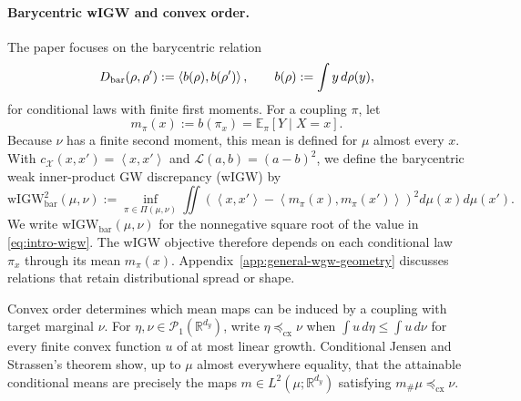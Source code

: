 \documentclass[11pt]{article}
\newcommand{\R}{\mathbb R}
\newcommand{\E}{\mathbb E}
\newcommand{\cP}{\mathcal P}
\newcommand{\ip}[2]{\left\langle #1,#2\right\rangle}
\newcommand{\cx}{\preceq_{\mathrm{cx}}}
\newcommand{\wIGW}{\mathrm{wIGW}_{\mathrm{bar}}}
\theoremstyle{plain}
\theoremstyle{definition}
\theoremstyle{remark}
\begin{document}
\conditionalcomparisonfigure

\paragraph{Barycentric wIGW and convex order.}
The paper focuses on the barycentric relation
\[
 D_{\rm bar}(\rho,\rho')
 :=\ip{b(\rho)}{b(\rho')},
 \qquad b(\rho):=\int y\,d\rho(y),
\]
for conditional laws with finite first moments. For a coupling $\pi$, let
\[
 m_\pi(x):=b(\pi_x)=\E_\pi[Y\mid X=x].
\]
Because $\nu$ has a finite second moment, this mean is defined for
$\mu$ almost every $x$.
With $c_{\mathcal X}(x,x')=\ip{x}{x'}$ and
$\mathcal L(a,b)=(a-b)^2$, we define the barycentric weak inner-product GW
discrepancy (wIGW) by
\begin{equation}\label{eq:intro-wigw}
  \wIGW^2(\mu,\nu)
  :=\inf_{\pi\in\Pi(\mu,\nu)}
  \iint\left(\ip{x}{x'}-\ip{m_\pi(x)}{m_\pi(x')}\right)^2
  d\mu(x)d\mu(x').
\end{equation}
We write \(\wIGW(\mu,\nu)\) for the nonnegative square root of the value in
\eqref{eq:intro-wigw}.
The wIGW objective therefore depends on each conditional law $\pi_x$ through its
mean $m_\pi(x)$. Appendix~\ref{app:general-wgw-geometry} discusses relations that
retain distributional spread or shape.

Convex order determines which mean maps can be induced by a coupling with target
marginal $\nu$. For
$\eta,\nu\in\cP_1(\R^{d_y})$, write $\eta\cx\nu$ when
$\int u\,d\eta\le\int u\,d\nu$ for every finite convex function $u$ of at most
linear growth. Conditional Jensen and Strassen's theorem \cite{Strassen} show,
up to $\mu$ almost everywhere equality, that the attainable conditional means are
precisely the maps $m\in L^2(\mu;\R^{d_y})$ satisfying $m_\#\mu\cx\nu$.
\end{document}
